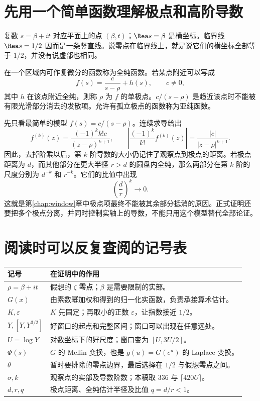 \section{先用一个简单函数理解极点和高阶导数}
复数 $s=\beta+it$ 对应平面上的点 $(\beta,t)$；$\Rea s=\beta$ 是横坐标。临界线 $\Rea s=1/2$ 因而是一条竖直线。说零点在临界线上，就是说它们的横坐标全部等于 $1/2$，并没有说虚部也相同。

在一个区域内可作复微分的函数称为全纯函数。若某点附近可以写成
\[
f(s)=\frac{c}{s-\rho}+h(s),\qquad c\ne0,
\]
其中 $h$ 在该点附近全纯，则称 $\rho$ 为 $f$ 的单极点。$c/(s-\rho)$ 是趋近该点时不能被有限光滑部分消去的发散项。允许有孤立极点的函数称为亚纯函数。

先只看最简单的模型 $f(s)=c/(s-\rho)$。连续求导给出
\[
f^{(k)}(z)=\frac{(-1)^k k!c}{(z-\rho)^{k+1}},
\qquad
\left|\frac{(-1)^k}{k!}f^{(k)}(z)\right|
=\frac{|c|}{|z-\rho|^{k+1}}.
\]
因此，去掉阶乘以后，第 $k$ 阶导数的大小仍记住了观察点到极点的距离。若极点距离为 $d$，而其他部分在更大半径 $r>d$ 的圆盘内全纯，那么两部分在第 $k$ 阶的尺度分别为 $d^{-k}$ 和 $r^{-k}$。它们的比值中出现
\[
\left(\frac dr\right)^k\longrightarrow0.
\]
这就是第\ref{chap:window}章中极点项最终不能被其余部分抵消的原因。正式证明还要把多个极点分离，并同时控制实轴上的导数，不能只用这个模型替代全部论证。

\section{阅读时可以反复查阅的记号表}
\begin{longtable}{@{}p{}p{}@{}}
\toprule
记号 & 在证明中的作用\\
\midrule
\endhead
$\rho=\beta+it$ & 假想的 $\zeta$ 零点；$\beta$ 是需要限制的实部。\\
$G(x)$ & 由素数幂加权和得到的归一化实函数，负责承接算术估计。\\
$K,\varepsilon$ & $K$ 先固定；再取小的正数 $\varepsilon$，让指数接近 $1/2$。\\
$Y,[Y,Y^{3/2}]$ & 好窗口的起点和完整区间；窗口可以出现在任意远处。\\
$U=\log Y$ & 对数坐标下的好尺度；窗口变为 $[U,3U/2]$。\\
$\Phi(s)$ & $G$ 的 Mellin 变换，也是 $g(u)=G(e^u)$ 的 Laplace 变换。\\
$\theta$ & 暂时要排除的零点边界，最后选择在 $1/2$ 与假想零点之间。\\
$\sigma,k$ & 观察点的实部及导数阶数；本稿取 $336$ 与 $\lceil420U\rceil$。\\
$d,r,q$ & 极点距离、全纯估计半径及比值 $q=d/r<1$。\\
\bottomrule
\end{longtable}
